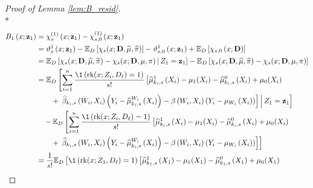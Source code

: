 \begin{proof}[Proof of Lemma \ref{lem:B_resid}]\mbox{}\\*
    \begin{equation}
        \begin{aligned}
            B_{1}\left(x; \mathbf{z}_1\right)
            & = \chi_{s}^{(1)}\left(x; \mathbf{z}_1\right) - \chi_{s,0}^{(1)}\left(x; \mathbf{z}_1\right)\\
            & = \vartheta_{s}^{1}\left(x; \mathbf{z}_{1}\right)
            - \E_{D}\left[\chi_{s}(x; \mathbf{D}, \hat{\mu}, \hat{\pi})\right]
            - \vartheta_{s,0}^{1}\left(x; \mathbf{z}_{1}\right) 
            + \E_{D}\left[\chi_{s,0}\left(x; \mathbf{D}\right)\right] \\
            & = \E_{D}\left[\chi_{s}(x; \mathbf{D}, \hat{\mu}, \hat{\pi}) - \chi_{s}(x; \mathbf{D}, \mu, \pi)\, \middle| \, Z_1 = \mathbf{z}_1\right]
            - \E_{D}\left[\chi_{s}(x; \mathbf{D}, \hat{\mu}, \hat{\pi}) - \chi_{s}(x; \mathbf{D}, \mu, \pi)\right] \\
            & = \E_{D}\left[\sum_{i = 1}^{n}\frac{\1\left(\rk(x; Z_{i}, D_{\ell}) = 1\right)}{s!}   
            \left[\hat{\mu}_{k_i,s}^{1}\left(X_{i}\right) - \mu_{1}(X_{i})
            - \hat{\mu}_{k_i,s}^{0}\left(X_{i}\right) + \mu_{0}(X_{i}) \right. \right.\\
            & \quad \quad + \left. \left. 
            \hat{\beta}_{k_i,s}\left(W_{i}, X_{i}\right)\left(Y_{i} - \hat{\mu}^{W_{i}}_{k_i,s}\left(X_{i}\right)\right)
            - \beta\left(W_{i}, X_{i}\right)\left(Y_{i} - \mu_{W_{i}}\left(X_{i}\right)\right)\right]
            \, \middle| \, Z_1 = \mathbf{z}_1\right] \\
            & \quad - \E_{D}\left[\sum_{i = 1}^{n}\frac{\1\left(\rk(x; Z_{i}, D_{\ell}) = 1\right)}{s!}   
            \left[\hat{\mu}_{k_i,s}^{1}\left(X_{i}\right) - \mu_{1}(X_{i})
            - \hat{\mu}_{k_i,s}^{0}\left(X_{i}\right) + \mu_{0}(X_{i}) \right. \right.\\
            & \quad \quad + \left. \left. 
            \hat{\beta}_{k_i,s}\left(W_{i}, X_{i}\right)\left(Y_{i} - \hat{\mu}^{W_{i}}_{k_i,s}\left(X_{i}\right)\right)
            - \beta\left(W_{i}, X_{i}\right)\left(Y_{i} - \mu_{W_{i}}\left(X_{i}\right)\right)\right]\right] \\
            & = \frac{1}{s!}\E_{D}\left[\1\left(\rk(x; Z_{1}, D_{\ell}) = 1\right)   
            \left[\hat{\mu}_{k_1,s}^{1}\left(X_{1}\right) - \mu_{1}(X_{1})
            - \hat{\mu}_{k_1,s}^{0}\left(X_{1}\right) + \mu_{0}(X_{1}) \right. \right.\\

\end{aligned}
\end{equation}
\end{proof}
